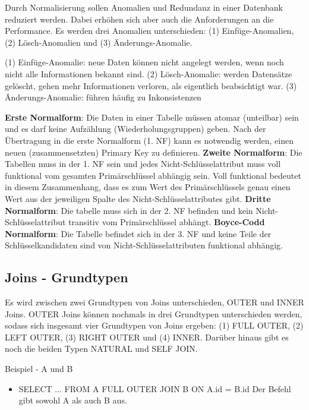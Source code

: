Durch Normalisierung sollen Anomalien und Redundanz in einer Datenbank reduziert werden. Dabei erhöhen sich aber auch die Anforderungen an die Performance. Es werden drei Anomalien unterschieden: (1) Einfüge-Anomalien, (2) Lösch-Anomalien und (3) Änderungs-Anomalie.

(1) Einfüge-Anomalie: neue Daten können nicht angelegt werden, wenn noch nicht alle Informationen bekannt sind.
(2) Lösch-Anomalie: werden Datensätze gelöscht, gehen mehr Informationen verloren, als eigentlich beabsichtigt war.
(3) Änderungs-Anomalie: führen häufig zu Inkonsistenzen

{\bf Erste Normalform}: Die Daten in einer Tabelle müssen atomar (unteilbar) sein und es darf keine Aufzählung (Wiederholungsgruppen) geben. Nach der Übertragung in die erste Normalform (1. NF) kann es notwendig werden, einen neuen (zusammensetzten) Primary Key zu definieren.
{\bf Zweite Normalform}: Die Tabellen muss in der 1. NF sein und jedes Nicht-Schlüsselattribut muss voll funktional vom gesamten Primärschlüssel abhängig sein. Voll funktional bedeutet in diesem Zusammenhang, dass es zum Wert des Primärschlüssels genau einen Wert aus der jeweiligen Spalte des Nicht-Schlüsselattributes gibt.
{\bf Dritte Normalform}: Die tabelle muss sich in der 2. NF befinden und kein Nicht-Schlüsselattribut transitiv vom Primärschlüssel abhängt.
{\bf Boyce-Codd Normalform}: Die Tabelle befindet sich in der 3. NF und keine Teile der Schlüsselkandidaten sind von Nicht-Schlüsselattributen funktional abhängig.

\subsection{Joins - Grundtypen}

Es wird zwischen zwei Grundtypen von Joins unterschieden, OUTER und INNER Joins. OUTER Joins können nochmals in drei Grundtypen unterschieden werden, sodass sich insgesamt vier Grundtypen von Joins ergeben: (1) FULL OUTER, (2) LEFT OUTER, (3) RIGHT OUTER und (4) INNER. Darüber hinaus gibt es noch die beiden Typen NATURAL und SELF JOIN.

Beispiel - A und B
\begin{itemize}
	\item SELECT ... FROM A FULL OUTER JOIN B ON A.id = B.id
	Der Befehl gibt sowohl A als auch B aus.
\end{itemize}

